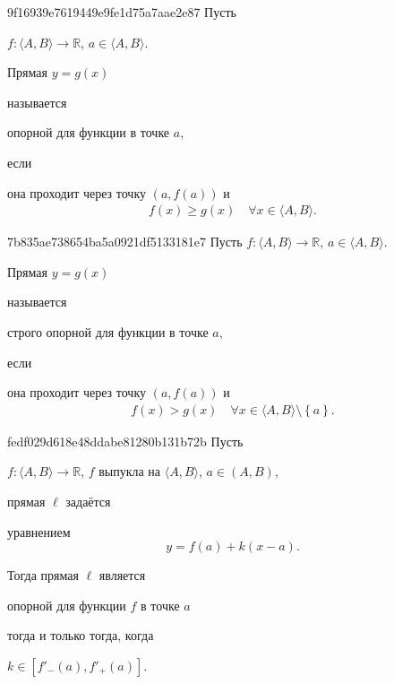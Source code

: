\begin{note}{9f16939e7619449e9fe1d75a7aae2e87}
    Пусть \begin{icloze}{3}\( f : \langle A, B \rangle \to \mathbb R  \), \( a \in \langle A, B \rangle  \).\end{icloze}
    \begin{icloze}{2}Прямая \( y = g(x) \)\end{icloze} называется \begin{icloze}{1}опорной для функции в точке \( a \),\end{icloze} если
    \begin{icloze}{2}
        она проходит через точку \( (a, f(a)) \) и
        \[
            \begin{gathered}
                f(x) \geqslant g(x) \quad \forall x \in \langle A, B \rangle.
            \end{gathered}
        \]
    \end{icloze}
\end{note}

\begin{note}{7b835ae738654ba5a0921df5133181e7}
    Пусть \( f : \langle A, B \rangle \to \mathbb R  \), \( a \in \langle A, B \rangle  \).
    \begin{icloze}{2}Прямая \( y = g(x) \)\end{icloze} называется \begin{icloze}{1}строго опорной для функции в точке \( a \),\end{icloze} если
    \begin{icloze}{2}
        она проходит через точку \( (a, f(a)) \) и
        \[
            \begin{gathered}
                f(x) > g(x) \quad \forall x \in \langle A, B \rangle \setminus \left\{ a \right\}.
            \end{gathered}
        \]
    \end{icloze}
\end{note}

\begin{note}{fedf029d618e48ddabe81280b131b72b}
    Пусть \begin{icloze}{5}\( f : \langle A, B \rangle \to \mathbb R  \), \( f \) выпукла на \( \langle A, B \rangle  \), \( a \in (A, B) \),\end{icloze} прямая \( \ell \) задаётся
    \begin{icloze}{4}
        уравнением
        \[
            y = f(a) + k(x - a).
        \]
    \end{icloze}
    Тогда прямая \( \ell \) является \begin{icloze}{1}опорной для функции \( f \)
    в точке \( a \)\end{icloze} \begin{icloze}{3}тогда и только тогда, когда\end{icloze}
    \begin{icloze}{2}
        \( k \in [f'_-(a), f'_+(a)] \).
    \end{icloze}
\end{note}

